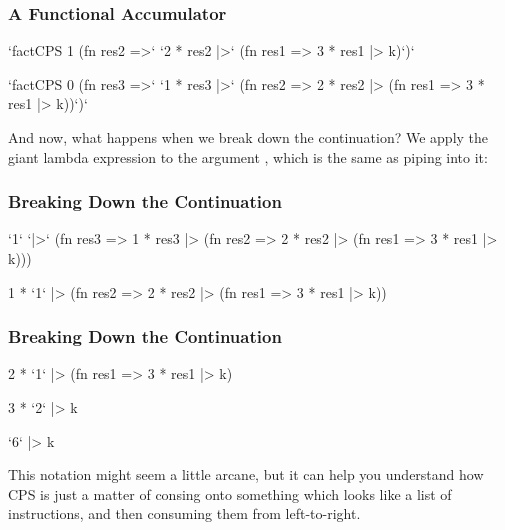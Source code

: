 \documentclass[aspectratio=169, handout]{beamer}
\begin{document}
\begin{frame}[fragile]
  \frametitle{A Functional Accumulator}

  \begin{codeblock}
    `factCPS 1    (fn res2 =>`
    `2 * res2  |>` (fn res1 =>
    3 * res1  |> k)`)`
  \end{codeblock}

  \pause
  \vspace{\fill}

  \begin{codeblock}
    `factCPS 0    (fn res3 =>`
    `1 * res3  |>` (fn res2 =>
    2 * res2  |> (fn res1 =>
    3 * res1  |> k))`)`
  \end{codeblock}

  And now, what happens when we break down the continuation? We apply the
  giant lambda expression to the argument , which is the same as
  piping  into it:
\end{frame}

\begin{frame}[fragile]
  \frametitle{Breaking Down the Continuation}

  \begin{codeblock}
    `1`         `|>` (fn res3 =>
    1 * res3  |> (fn res2 =>
    2 * res2  |> (fn res1 =>
    3 * res1  |> k)))
  \end{codeblock}
  
  \pause
  \vspace{\fill}

  \begin{codeblock}
    1 * `1`     |> (fn res2 =>
    2 * res2  |> (fn res1 =>
    3 * res1  |> k))
  \end{codeblock}
\end{frame}

\begin{frame}[fragile]
  \frametitle{Breaking Down the Continuation}

  \begin{codeblock}
    2 * `1`     |> (fn res1 =>
    3 * res1  |> k)
  \end{codeblock}

  \pause
  \vspace{\fill}

  \begin{codeblock}
    3 * `2`     |> k
  \end{codeblock}

  \pause
  \vspace{\fill}

  \begin{codeblock}
    `6`         |> k
  \end{codeblock}

  \pause
  \vspace{\fill}

  This notation might seem a little arcane, but it can help you understand how
  CPS is just a matter of consing onto something which looks like a list of
  instructions, and then consuming them from left-to-right.
\end{frame}
\end{document}
